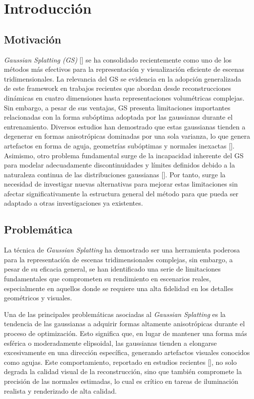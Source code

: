 \chapter{Introducción}\label{chapter\:introduction}

\section{Motivación}
\textit{Gaussian Splatting (GS)} [\cite{kerbl20233d}] se ha consolidado recientemente como uno de los métodos más efectivos para la representación y 
visualización eficiente de escenas tridimensionales. La relevancia del GS se evidencia en la adopción generalizada 
de este framework en trabajos recientes que abordan desde reconstrucciones dinámicas en cuatro dimensiones hasta representaciones volumétricas complejas. 
Sin embargo, a pesar de sus ventajas, GS presenta limitaciones importantes relacionadas con la forma subóptima adoptada por las gaussianas durante el 
entrenamiento. Diversos estudios han demostrado que estas gaussianas tienden a degenerar en formas anisotrópicas dominadas por una sola varianza, 
lo que genera artefactos en forma de aguja, geometrías subóptimas y normales inexactas [\cite{hyung2024effectiverankanalysisregularization, huang2024spectralgstaming3dgaussian,yu2023mipsplattingaliasfree3dgaussian}]. 
Asimismo, otro problema fundamental surge de la incapacidad inherente del GS para modelar adecuadamente discontinuidades y límites definidos 
debido a la naturaleza continua de las distribuciones gaussianas [\cite{qu2024discgsdiscontinuityawaregaussiansplatting}]. Por tanto, surge 
la necesidad de investigar nuevas alternativas para mejorar estas limitaciones sin afectar significativamente la estructura general del método
para que pueda ser adaptado a otras investigaciones ya existentes.

\section{Problemática}
La técnica de \textit{Gaussian Splatting} ha demostrado ser una herramienta poderosa para la representación de escenas tridimensionales complejas,
sin embargo, a pesar de su eficacia general, se han identificado una serie de limitaciones fundamentales que comprometen su rendimiento 
en escenarios reales, especialmente en aquellos donde se requiere una alta fidelidad en los detalles geométricos y visuales.

Una de las principales problemáticas asociadas al \textit{Gaussian Splatting} es la tendencia de las gaussianas a adquirir formas altamente anisotrópicas 
durante el proceso de optimización. Esto significa que, en lugar de mantener una forma más esférica o moderadamente elipsoidal, las gaussianas 
tienden a elongarse excesivamente en una dirección específica, generando artefactos visuales conocidos como agujas. 
Este comportamiento, reportado en estudios recientes  [\cite{hyung2024effectiverankanalysisregularization, huang2024spectralgstaming3dgaussian, yu2023mipsplattingaliasfree3dgaussian}],
no solo degrada la calidad visual de la reconstrucción, sino que también compromete la precisión de las normales estimadas, lo cual es crítico 
en tareas de iluminación realista y renderizado de alta calidad.

